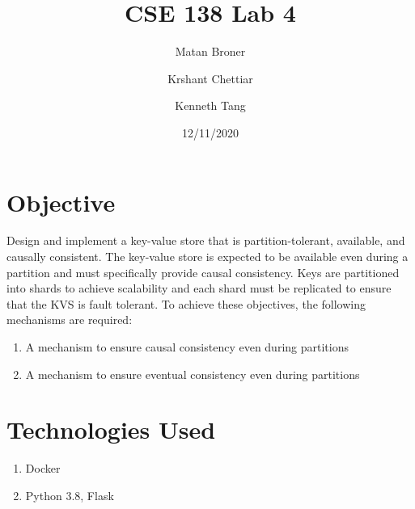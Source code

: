 \documentclass[12pt]{article}
\title{CSE 138 Lab 4}
\author{
  Matan Broner\\
  \and
  Krshant Chettiar\\
  \and 
  Kenneth Tang
}
\date{12/11/2020}
\begin{document}
\maketitle

\section{Objective}
Design and implement a key-value store that is partition-tolerant, available, and causally consistent. The key-value store is expected to be available even during a partition and must specifically provide causal consistency. Keys are partitioned into shards to achieve scalability and each shard must be replicated to ensure that the KVS is fault tolerant.
\newline
To achieve these objectives, the following mechanisms are required:
\begin{enumerate}
	\item A mechanism to ensure causal consistency even during partitions
	\item A mechanism to ensure eventual consistency even during partitions

\end{enumerate}

\section{Technologies Used}
\begin{enumerate}
	\item Docker
	\item Python 3.8, Flask
\end{enumerate}
\end{document}
